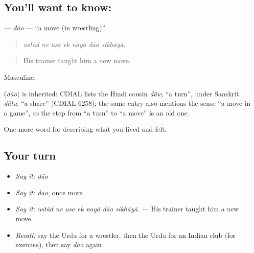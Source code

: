 \subsection*{You'll want to know: }
\textbf{} — \emph{dāo} — \textquotedblleft{}a move (in wrestling)\textquotedblright{}.

\begin{quote}
      
\end{quote}

\begin{quote}
\emph{ustād ne use ek nayā dāo sikhāyā.}
\end{quote}

\begin{quote}
His trainer taught him a new move.
\end{quote}

Masculine.

\begin{cousinweb}
\textbf{} (\emph{dāo}) is inherited: CDIAL lists the Hindi cousin \emph{dā̃w}, \textquotedblleft{}a turn\textquotedblright{}, under Sanskrit \emph{dātu}, \textquotedblleft{}a share\textquotedblright{} (CDIAL 6258); the same entry also mentions the sense \textquotedblleft{}a move in a game\textquotedblright{}, so the step from \textquotedblleft{}a turn\textquotedblright{} to \textquotedblleft{}a move\textquotedblright{} is an old one.
\end{cousinweb}

\begin{grammarlens}[title={What you've built}]
One more word for describing what you lived and felt.
\end{grammarlens}

\subsection*{Your turn}
\begin{itemize}
\raggedright
  \item \emph{Say it:} \emph{dāo}
  \item \emph{Say it:} \emph{dāo}, once more
  \item \emph{Say it:} \emph{ustād ne use ek nayā dāo sikhāyā.} — His trainer taught him a new move.
  \item \emph{Recall:} say the Urdu for a wrestler, then the Urdu for an Indian club (for exercise), then say \emph{dāo} again
\end{itemize}


